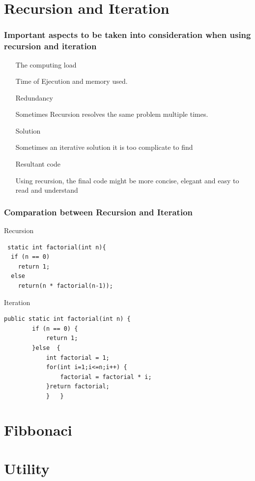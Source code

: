 \documentclass[11pt]{beamer}
\begin{document}
\section{Recursion and Iteration}
\begin{frame}
\frametitle{Important aspects to be taken into consideration when using recursion and iteration}
\begin{itemize}
\item [The computing load] 
\begin{description}
Time of Ejecution and memory used.
\end{description}
\item [Redundancy]
\begin{description}
Sometimes Recursion resolves the same problem multiple times.
\end{description}
\item [Solution]
\begin{description}
Sometimes an iterative solution it is too complicate to find
\end{description}
\item [Resultant code]
\begin{description}
Using recursion, the final code might be more concise, elegant and easy to read and understand
\end{description}
\end{itemize}

\end{frame}
\begin{frame}[fragile]
\frametitle{Comparation between Recursion and Iteration}
Recursion
\begin{verbatim}
 static int factorial(int n){    
  if (n == 0)    
    return 1;    				
  else    
    return(n * factorial(n-1));	
\end{verbatim}
\end{frame}
\begin{frame}[fragile]
Iteration
\begin{verbatim}
public static int factorial(int n) {
		if (n == 0) {
			return 1;
		}else  {
			int factorial = 1;
			for(int i=1;i<=n;i++) {
				factorial = factorial * i;	
			}return factorial;
			}	}
\end{verbatim}
\end{frame}

\section{Fibbonaci}


\section{Utility}
\end{document}
